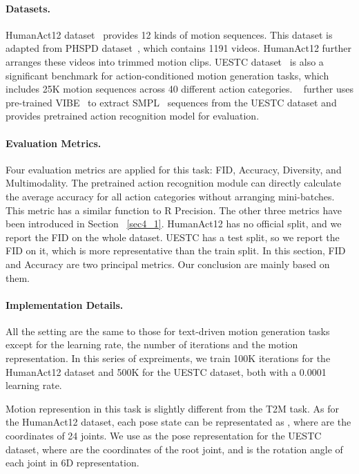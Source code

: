 \paragraph{Datasets.}\label{sec4_2_1} HumanAct12 dataset~\citep{guo2020action2motion} provides 12 kinds of motion sequences. This dataset is adapted from PHSPD dataset~\citep{zou20203d}, which contains 1191 videos. HumanAct12 further arranges these videos into trimmed motion clips. UESTC dataset~\citep{ji2018large} is also a significant benchmark for action-conditioned motion generation tasks, which includes 25K motion sequences across 40 different action categories. ~\cite{petrovich2021action} further uses pre-trained VIBE~\citep{kocabas2020vibe} to extract SMPL~\citep{loper2015smpl} sequences from the UESTC dataset and provides pretrained action recognition model for evaluation.

\paragraph{Evaluation Metrics.}\label{sec4_2_2} Four evaluation metrics are applied for this task: FID, Accuracy, Diversity, and Multimodality. The pretrained action recognition module can directly calculate the average accuracy for all action categories without arranging mini-batches. This metric has a similar function to R Precision. The other three metrics have been introduced in Section ~\ref{sec4_1}. HumanAct12 has no official split, and we report the FID on the whole dataset. UESTC has a test split, so we report the FID on it, which is more representative than the train split. In this section, FID and Accuracy are two principal metrics. Our conclusion are mainly based on them.

\paragraph{Implementation Details.}\label{sec4_2_3}
All the setting are the same to those for text-driven motion generation tasks except for the learning rate, the number of iterations and the motion representation. In this series of expreiments, we train 100K iterations for the HumanAct12 dataset and 500K for the UESTC dataset, both with a 0.0001 learning rate.

Motion represention in this task is slightly different from the T2M task. As for the HumanAct12 dataset, each pose state can be representated as , where  are the coordinates of 24 joints. We use  as the pose representation for the UESTC dataset, where  are the coordinates of the root joint, and  is the rotation angle of each joint in 6D representation.



